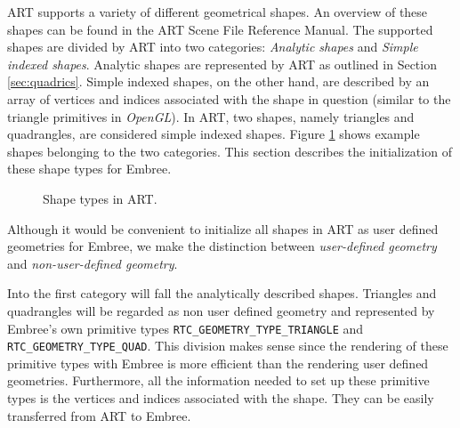 ART supports a variety of different geometrical shapes. An overview of these shapes can be found in the ART Scene File Reference Manual. The supported shapes are divided by ART into two categories: \emph{Analytic shapes} and \emph{Simple indexed shapes}. Analytic shapes are represented by ART as outlined in Section \ref{sec:quadrics}. Simple indexed shapes, on the other hand, are described by an array of vertices and indices associated with the shape in question (similar to the triangle primitives in \emph{OpenGL}). In ART, two shapes, namely triangles and quadrangles, are considered simple indexed shapes. Figure \ref{fig:shape_types} shows example shapes belonging to the two categories. 
This section describes the initialization of these shape types for Embree.


\begin{figure}[!tbp]
	\centering
	\hfil
	\caption{Shape types in ART.}
	\label{fig:shape_types}
\end{figure}

Although it would be convenient to initialize all shapes in ART as user defined geometries for Embree, we make the distinction between \emph{user-defined geometry} and \emph{non-user-defined geometry}.

Into the first category will fall the analytically described shapes. Triangles and quadrangles will be regarded as non user defined geometry and represented by Embree's own primitive types \texttt{RTC\_GEOMETRY\_TYPE\_TRIANGLE} and \texttt{RTC\_GEOMETRY\_TYPE\_QUAD}. This division makes sense since the rendering of these primitive types with Embree is more efficient than the rendering user defined geometries. Furthermore, all the information needed to set up these primitive types is the vertices and indices associated with the shape. They can be easily transferred from ART to Embree. 


